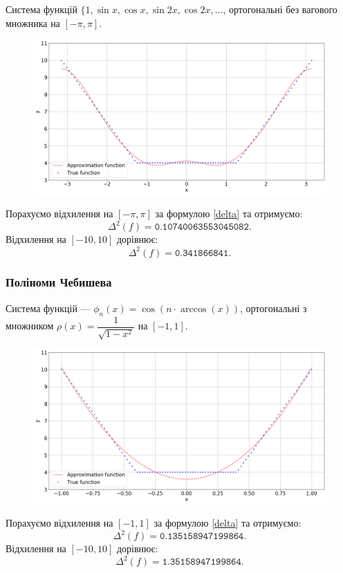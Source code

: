 Система функцій $\{1, \sin x, \cos x, \sin 2x, \cos 2x, \ldots$, ортогональні без вагового множника на $[-\pi,\pi]$.

\begin{figure}[H]
    \centering
    \includegraphics[width=\textwidth]{trigonometric.png}
\end{figure}
Порахуємо відхилення на $[-\pi, \pi]$ за формулою \eqref{delta} та отримуємо: \[ \Delta^2(f) = \texttt{0.10740063553045082}. \] Відхилення на $[-10, 10]$ дорівнює: \[ \Delta^2(f) = \texttt{0.341866841}. \]

\newpage

\subsubsection{Поліноми Чебишева}

Система функцій --- $\phi_n(x) = \cos (n \cdot \arccos(x))$, ортогональні з множником $\rho(x) = \dfrac{1}{\sqrt{1 - x^2}}$ на $[-1,1]$.

\begin{figure}[H]
    \centering
    \includegraphics[width=\textwidth]{chebyshev.png}
\end{figure}
Порахуємо відхилення на $[-1, 1]$ за формулою \eqref{delta} та отримуємо: \[ \Delta^2(f) = \texttt{0.135158947199864}. \] Відхилення на $[-10, 10]$ дорівнює: \[ \Delta^2(f) = \texttt{1.35158947199864}. \]


